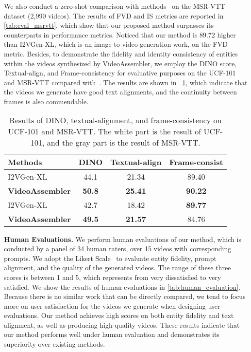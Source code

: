 We also conduct a zero-shot comparison with methods~\cite{hong2023cogvideo,zhou2022magicvideo,zhang2023i2vgen-xl} on the MSR-VTT dataset (2,990 videos). The results of FVD and IS metrics are reported in \cref{tab:eval_msrvtt}, which show that our proposed method surpasses its counterparts in performance metrics. Noticed that our method is 89.72 higher than I2VGen-XL, which is an image-to-video generation work, on the FVD metric. Besides, to demonstrate the fidelity and identity consistency of entities within the videos synthesized by VideoAssembler, we employ the DINO score, Textual-align, and Frame-consistency for evaluative purposes on the UCF-101 and MSR-VTT compared with~\cite{zhang2023i2vgen-xl}. The results are shown in ~\cref{tab:dino_alignment_consistency}, which indicate that the videos we generate have good text alignments, and the continuity between frames is also commendable.



\begin{table}[ht]
    \setlength{\tabcolsep}{1.2mm}
    \centering
    \begin{tabular}{lccc}
       \toprule
       Methods & DINO & Textual-align & Frame-consist \\
       \midrule
       I2VGen-XL~\cite{zhang2023i2vgen-xl} & 44.1 & 21.34 & 89.40 \\
       \textbf{VideoAssembler} & \textbf{50.8} & \textbf{25.41} & \textbf{90.22} \\
       \midrule
       \rowcolor{gray!20}
       I2VGen-XL~\cite{zhang2023i2vgen-xl} & 42.7 & 18.42 & \textbf{89.77} \\
       \rowcolor{gray!20}
       \textbf{VideoAssembler} & \textbf{49.5} & \textbf{21.57} & 84.76 \\
       \bottomrule
    \end{tabular}
    \caption{Results of DINO, textual-alignment, and frame-consistency on UCF-101 and MSR-VTT. The white part is the result of UCF-101, and the gray part is the result of MSR-VTT.}
    \label{tab:dino_alignment_consistency}
\end{table}

\noindent
\textbf{Human Evaluations.} We perform human evaluations of our method, which is conducted by a panel of 34 human raters, over 15 videos with corresponding prompts. We adopt the Likert Scale~\cite{likert1932technique} to evaluate entity fidelity, prompt alignment, and the quality of the generated videos. The range of these three scores is between 1 and 5, which represents from very dissatisfied to very satisfied. We show the results of human evaluations in \cref{tab:human_evaluation}. Because there is no similar work that can be directly compared, we tend to focus more on user satisfaction for the videos we generate when designing user evaluations. Our method achieves high scores on both entity fidelity and text alignment, as well as producing high-quality videos. These results indicate that our method performs well under human evaluation and demonstrates its superiority over existing methods.

